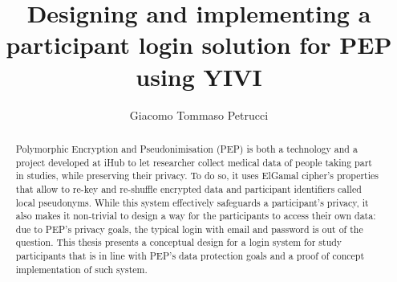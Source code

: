\documentclass{report}
\begin{document}
\title{Designing and implementing a participant login solution for PEP using YIVI}
\author{Giacomo Tommaso Petrucci}
\maketitle

\begin{abstract}
	Polymorphic Encryption and Pseudonimisation (PEP) is both a technology and a project developed at iHub to let researcher collect medical data of people taking part in studies, 
	while preserving their privacy. To do so, it uses ElGamal cipher's properties that allow to re-key and re-shuffle encrypted data and participant identifiers called local 
	pseudonyms. While this system effectively safeguards a participant's privacy, it also makes it non-trivial to design a way for the participants to access their own data: due to 
	PEP's privacy goals, the typical login with email and password is out of the question. This thesis presents a conceptual design for a login system for study participants that
	is in line with PEP's data protection goals and a proof of concept implementation of such system. 
\end{abstract}

\tableofcontents
\pagebreak
\end{document}
